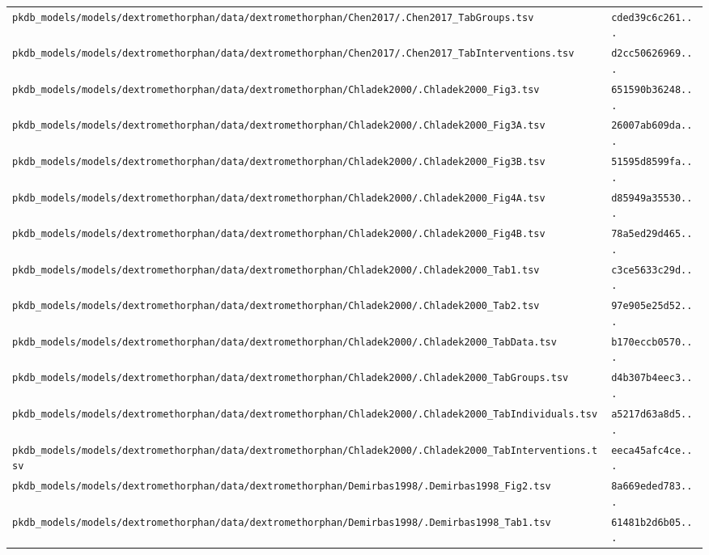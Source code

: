 \documentclass{article}
\begin{document}
\begin{longtable}{ll}
\texttt{pkdb\_models/models/dextromethorphan/data/dextromethorphan/Chen2017/.Chen2017\_TabGroups.tsv} & \texttt{cded39c6c261...} \\
\texttt{pkdb\_models/models/dextromethorphan/data/dextromethorphan/Chen2017/.Chen2017\_TabInterventions.tsv} & \texttt{d2cc50626969...} \\
\texttt{pkdb\_models/models/dextromethorphan/data/dextromethorphan/Chladek2000/.Chladek2000\_Fig3.tsv} & \texttt{651590b36248...} \\
\texttt{pkdb\_models/models/dextromethorphan/data/dextromethorphan/Chladek2000/.Chladek2000\_Fig3A.tsv} & \texttt{26007ab609da...} \\
\texttt{pkdb\_models/models/dextromethorphan/data/dextromethorphan/Chladek2000/.Chladek2000\_Fig3B.tsv} & \texttt{51595d8599fa...} \\
\texttt{pkdb\_models/models/dextromethorphan/data/dextromethorphan/Chladek2000/.Chladek2000\_Fig4A.tsv} & \texttt{d85949a35530...} \\
\texttt{pkdb\_models/models/dextromethorphan/data/dextromethorphan/Chladek2000/.Chladek2000\_Fig4B.tsv} & \texttt{78a5ed29d465...} \\
\texttt{pkdb\_models/models/dextromethorphan/data/dextromethorphan/Chladek2000/.Chladek2000\_Tab1.tsv} & \texttt{c3ce5633c29d...} \\
\texttt{pkdb\_models/models/dextromethorphan/data/dextromethorphan/Chladek2000/.Chladek2000\_Tab2.tsv} & \texttt{97e905e25d52...} \\
\texttt{pkdb\_models/models/dextromethorphan/data/dextromethorphan/Chladek2000/.Chladek2000\_TabData.tsv} & \texttt{b170eccb0570...} \\
\texttt{pkdb\_models/models/dextromethorphan/data/dextromethorphan/Chladek2000/.Chladek2000\_TabGroups.tsv} & \texttt{d4b307b4eec3...} \\
\texttt{pkdb\_models/models/dextromethorphan/data/dextromethorphan/Chladek2000/.Chladek2000\_TabIndividuals.tsv} & \texttt{a5217d63a8d5...} \\
\texttt{pkdb\_models/models/dextromethorphan/data/dextromethorphan/Chladek2000/.Chladek2000\_TabInterventions.tsv} & \texttt{eeca45afc4ce...} \\
\texttt{pkdb\_models/models/dextromethorphan/data/dextromethorphan/Demirbas1998/.Demirbas1998\_Fig2.tsv} & \texttt{8a669eded783...} \\
\texttt{pkdb\_models/models/dextromethorphan/data/dextromethorphan/Demirbas1998/.Demirbas1998\_Tab1.tsv} & \texttt{61481b2d6b05...} \\

\end{longtable}
\end{document}
